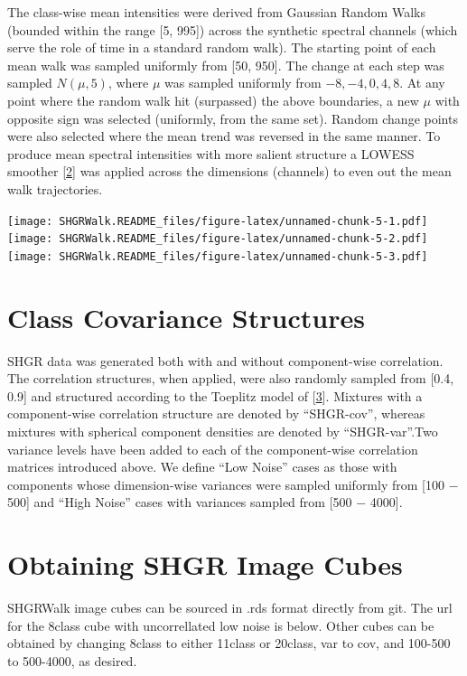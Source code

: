 \documentclass[]{article}
\begin{document}
The class-wise mean intensities were derived from Gaussian Random Walks (bounded within the range {[}5, 995{]}) across the synthetic spectral channels (which serve the role of time in a standard random walk). The starting point of each mean walk was sampled uniformly from {[}50, 950{]}. The change at each step was sampled \(N(\mu,5)\), where \(\mu\) was sampled uniformly from \({−8, −4, 0, 4, 8}\). At any point where the random walk hit (surpassed) the above boundaries, a new \(\mu\) with opposite sign was selected (uniformly, from the same set). Random change points were also selected where the mean trend was reversed in the same manner. To produce mean spectral intensities with more salient structure a LOWESS smoother {[}\protect\hyperlink{ref-Lowess}{2}{]} was applied across the dimensions (channels) to even out the mean walk trajectories.

\texttt{[image: SHGRWalk.README\_files/figure-latex/unnamed-chunk-5-1.pdf]} \texttt{[image: SHGRWalk.README\_files/figure-latex/unnamed-chunk-5-2.pdf]} \texttt{[image: SHGRWalk.README\_files/figure-latex/unnamed-chunk-5-3.pdf]}

\hypertarget{class-covariance-structures}{%
\section{Class Covariance Structures}\label{class-covariance-structures}}

SHGR data was generated both with and without component-wise correlation. The correlation structures, when applied, were also randomly sampled from {[}0.4, 0.9{]} and structured according to the Toeplitz model of {[}\protect\hyperlink{ref-Toeplitz}{3}{]}. Mixtures with a component-wise correlation structure are denoted by ``SHGR-cov'', whereas mixtures with spherical component densities are denoted by ``SHGR-var''.Two variance levels have been added to each of the component-wise correlation matrices introduced above. We define ``Low Noise'' cases as those with components whose dimension-wise variances were sampled uniformly from {[}100 − 500{]} and ``High Noise'' cases with variances sampled from {[}500 − 4000{]}.

\hypertarget{obtaining-shgr-image-cubes}{%
\section{Obtaining SHGR Image Cubes}\label{obtaining-shgr-image-cubes}}

SHGRWalk image cubes can be sourced in .rds format directly from git. The url for the 8class cube with uncorrellated low noise is below. Other cubes can be obtained by changing 8class to either 11class or 20class, var to cov, and 100-500 to 500-4000, as desired.
\end{document}
